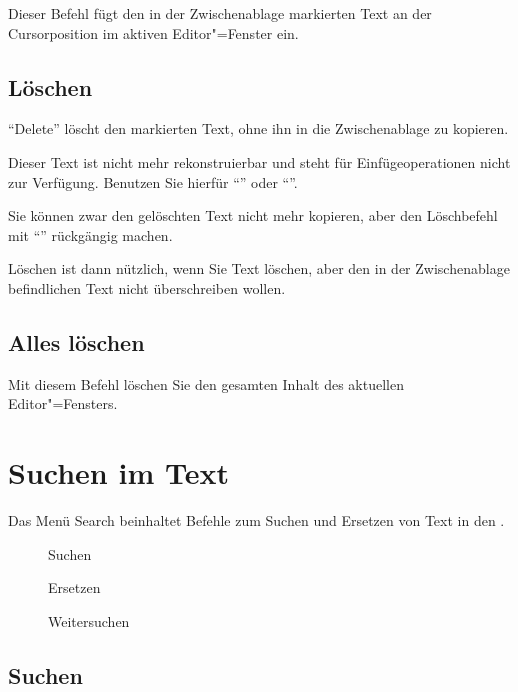Dieser Befehl fügt den in der Zwischenablage markierten Text 
an der Cursorposition im aktiven Editor"=Fenster ein.

\subsection{Löschen}
\label{sec:MI_DELETE}
"`Delete"' löscht den markierten Text, ohne ihn in die Zwischenablage 
zu kopieren.


Dieser Text ist nicht mehr rekonstruierbar und steht für Einfügeoperationen 
nicht zur Verfügung. Benutzen Sie hierfür "`"'
oder "`"'.


Sie können zwar den gelöschten Text nicht mehr kopieren, aber den
Löschbefehl mit "`"' rückgängig
machen.

Löschen ist dann nützlich, wenn Sie Text löschen, aber 
den in der Zwischenablage befindlichen Text nicht überschreiben 
wollen.

\subsection{Alles löschen}
\label{sec:MI_CLEAR}
Mit diesem Befehl löschen Sie den gesamten Inhalt des aktuellen 
Editor"=Fensters.



\section{Suchen im Text}\label{sec:MS_SEARCH}
Das Menü Search beinhaltet Befehle zum Suchen und Ersetzen 
von Text in den .

\begin{description}
\item[] Suchen
\item[] Ersetzen
\item[] Weitersuchen
\end{description}

\subsection{Suchen}
\label{sec:MI_FIND}

